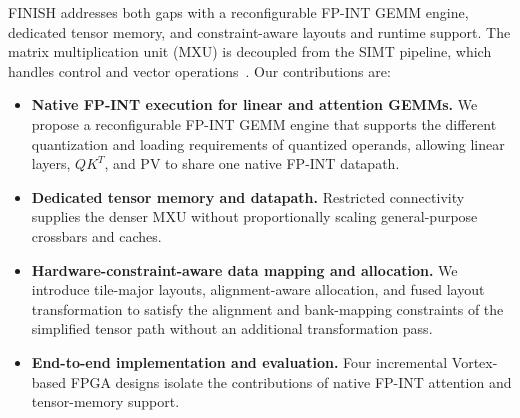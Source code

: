 \documentclass[sigconf,anonymous,nonacm]{acmart}
\newcommand{\ours}{\textsc{FINISH}}
\newcommand{\fpint}{FP-INT}
\begin{document}
\ours{} addresses both gaps with a reconfigurable \fpint{} GEMM engine, dedicated tensor memory, and constraint-aware layouts and runtime support. The matrix multiplication unit (MXU) is decoupled from the SIMT pipeline, which handles control and vector operations~\cite{virgo,gemmini}. Our contributions are:


\begin{itemize}[leftmargin=*]
\item \textbf{Native \fpint{} execution for linear and attention GEMMs.} We propose a reconfigurable \fpint{} GEMM engine that supports the different quantization and loading requirements of quantized operands, allowing linear layers, $QK^T$, and PV to share one native \fpint{} datapath.

\item \textbf{Dedicated tensor memory and datapath.} Restricted connectivity supplies the denser MXU without proportionally scaling general-purpose crossbars and caches.

\item \textbf{Hardware-constraint-aware data mapping and allocation.} We introduce tile-major layouts, alignment-aware allocation, and fused layout transformation to satisfy the alignment and bank-mapping constraints of the simplified tensor path without an additional transformation pass.

\item \textbf{End-to-end implementation and evaluation.} Four incremental Vortex-based FPGA designs isolate the contributions of native \fpint{} attention and tensor-memory support.




\end{itemize}
\end{document}
